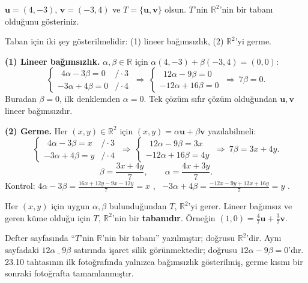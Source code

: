 \begin{soru}
$\mathbf u=(4,-3)$, $\mathbf v=(-3,4)$ ve $T=\{\mathbf u,\mathbf v\}$ olsun. $T$'nin $\mathbb R^2$'nin bir tabanı olduğunu gösteriniz.
\end{soru}
\begin{cevap}
Taban için iki şey gösterilmelidir: (1) lineer bağımsızlık, (2) $\mathbb R^2$'yi germe.

\textbf{(1) Lineer bağımsızlık.} $\alpha,\beta\in\mathbb R$ için $\alpha(4,-3)+\beta(-3,4)=(0,0)$:
\[
\begin{cases}\ \ 4\alpha-3\beta=0 & /\cdot 3\\ -3\alpha+4\beta=0 & /\cdot 4\end{cases}
\ \Rightarrow\
\begin{cases}\ \ 12\alpha-9\beta=0\\ -12\alpha+16\beta=0\end{cases}
\ \Rightarrow\ 7\beta=0 .
\]
Buradan $\beta=0$, ilk denklemden $\alpha=0$. Tek çözüm sıfır çözüm olduğundan $\mathbf u,\mathbf v$ lineer bağımsızdır.

\textbf{(2) Germe.} Her $(x,y)\in\mathbb R^2$ için $(x,y)=\alpha\mathbf u+\beta\mathbf v$ yazılabilmeli:
\[
\begin{cases}\ \ 4\alpha-3\beta=x & /\cdot 3\\ -3\alpha+4\beta=y & /\cdot 4\end{cases}
\ \Rightarrow\
\begin{cases}\ \ 12\alpha-9\beta=3x\\ -12\alpha+16\beta=4y\end{cases}
\ \Rightarrow\ 7\beta=3x+4y .
\]
\[
\beta=\frac{3x+4y}{7},\qquad \alpha=\frac{4x+3y}{7}.
\]
Kontrol: $4\alpha-3\beta=\frac{16x+12y-9x-12y}{7}=x$ \checkmark, \ $-3\alpha+4\beta=\frac{-12x-9y+12x+16y}{7}=y$ \checkmark.

Her $(x,y)$ için uygun $\alpha,\beta$ bulunduğundan $T$, $\mathbb R^2$'yi gerer. Lineer bağımsız ve geren küme olduğu için $T$, $\mathbb R^2$'nin bir \textbf{tabanıdır}. Örneğin $(1,0)=\frac47\mathbf u+\frac37\mathbf v$.
\end{cevap}

\begin{bilgi}
Defter sayfasında  ``$T$'nin $\mathbb R$'nin bir tabanı'' yazılmıştır; doğrusu $\mathbb R^2$'dir. Aynı sayfadaki $12\alpha\ \_\ 9\beta$ satırında işaret silik görünmektedir; doğrusu $12\alpha-9\beta=0$'dır. 23.10 tahtasının ilk fotoğrafında  yalnızca bağımsızlık gösterilmiş, germe kısmı bir sonraki fotoğrafta  tamamlanmıştır.
\end{bilgi}

